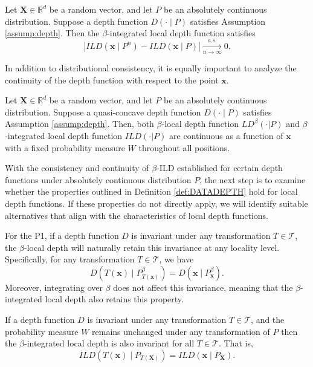 \documentclass[final,3p,times]{elsarticle}
\newcommand{\vecx}{\mathbf{x}}
\newcommand{\vecX}{\mathbf{X}}
\begin{document}
\begin{property}[Consistency]\label{prop:consis}
    Let $\vecX \in \mathbb{R}^d$ be a random vector, and let $P$ be an absolutely continuous distribution. Suppose a depth function $ D(\cdot \mid P) $ satisfies Assumption \ref{assump:depth}. Then the $\beta$-integrated local depth function satisfies
    \[
    |ILD(\vecx \mid P^{n}) - ILD(\vecx \mid P)| \xrightarrow[n \to \infty]{a.s.} 0.
    \]
\end{property}
In addition to distributional consistency, it is equally important to analyze the continuity of the depth function with respect to the point $\vecx$.
\begin{property}[Continuity as a function of $\vecx$]\label{prop:ctn}
  Let $\vecX \in \mathbb{R}^d$ be a random vector, and let $P$ be an absolutely continuous distribution. Suppose a quasi-concave depth function $ D(\cdot \mid P) $ satisfies Assumption \ref{assump:depth}. Then, both $\beta$-local depth function $LD^\beta(\cdot|P)$ and $\beta$-integrated local depth function $ILD(\cdot|P)$ are continuous as a function of $\vecx$ with a fixed probability measure $W$ throughout all positions.
\end{property}
With the consistency and continuity of $\beta$-ILD established for certain depth functions under absolutely continuous distribution $P$, the next step is to examine whether the properties outlined in Definition \ref{def:DATADEPTH} hold for local depth functions. If these properties do not directly apply, we will identify suitable alternatives that align with the characteristics of local depth functions.

For the P1, if a depth function $ D $ is invariant under any transformation $ T \in \mathcal{T} $, the $\beta$-local depth will naturally retain this invariance at any locality level. Specifically, for any transformation $ T \in \mathcal{T} $, we have
\[
D(T(\vecx) \mid P^\beta_{T(\vecx)}) = D(\vecx \mid P^\beta_{\vecx}).
\]
Moreover, integrating over $\beta$ does not affect this invariance, meaning that the $\beta$-integrated local depth also retains this property.
\begin{property}\label{prop:inva}
    If a depth function $ D $ is invariant under any transformation $ T \in \mathcal{T} $, and the probability measure $W$  remains unchanged under any transformation of $P$ then the $\beta$-integrated local depth is also invariant for all $ T \in \mathcal{T} $. That is,
    \[
    ILD(T(\vecx) \mid P_{T(\vecX)}) = ILD(\vecx \mid P_{\vecX}).
    \]
\end{property}
\end{document}
